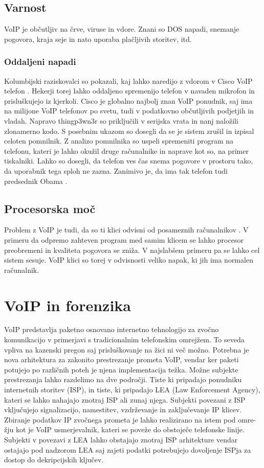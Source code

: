 \documentclass{acm_proc_article-sp}
\begin{document}
\subsection{Varnost}
VoIP je občutljiv na črve, viruse in vdore. Znani so DOS napadi, snemanje pogovora, kraja seje in nato uporaba plačljivih storitev, itd.

\subsubsection{Oddaljeni napadi}
Kolumbijski raziskovalci so pokazali, kaj lahko naredijo z vdorom v Cisco VoIP telefon \cite{CISCO}. Hekerji torej lahko oddaljeno spremenijo telefon v navaden mikrofon in prisluškujejo iz kjerkoli. Cisco je globalno najbolj znan VoIP ponudnik, saj ima na milijone VoIP telefonov po svetu, tudi v podatkovno občutljivih podjetjih in vladah. Napravo thingp3wn3r so priključili v serijska vrata in nanj naložili zlonamerno kodo. S posebnim ukazom so dosegli da se je sistem zrušil in izpisal celoten pomnilnik. Z analizo pomnilnika so uspeli spremeniti program na telefonu, kateri je lahko okužil druge računalnike in naprave kot so, na primer tiskalniki. Lahko so dosegli, da telefon ves čas snema pogovore v prostoru tako, da uporabnik tega sploh ne zazna. Zanimivo je, da ima tak telefon tudi predsednik Obama \cite{OBAMA}.


\subsection{Procesorska moč}
Problem z VoIP je tudi, da so ti klici odvisni od posameznih računalnikov \cite{PROBLEMS}. V primeru da odpremo zahteven program med samim klicem se lahko procesor preobremeni in kvaliteta pogovora se zniža. V najslabšem primeru pa se lahko cel sistem sesuje. VoIP klici so torej v odvisnosti veliko napak, ki jih ima normalen računalnik.


\section{VoIP in forenzika}
VoIP predstavlja paketno osnovano internetno tehnologijo za zvočno komunikacijo v primerjavi s tradicionalnim telefonskim omrejžem. To seveda vpliva na kazenski pregon saj prisluškovanje na žici ni več možno. Potrebna je nova arhitektura za zakonito prestrezanje prometa VoIP, vendar ker paketi potujejo po različnih poteh je njena implementacija težka. Možne subjekte prestrezanja lahko razdelimo na dve področji. Tiste ki pripadajo ponudniku internetnih storitev (ISP), in tiste, ki pripadajo LEA (Law Enforcement Agency), kateri se lahko nahajajo znotraj ISP ali zunaj njega. Subjekti povezani z ISP vključujejo signalizacijo, namestitev, vzdrževanje in zaključevanje IP klicev. Zbiranje podatkov IP zvočnega prometa je lahko realizirano na istem pod omre-žju kot je VoIP usmerjevalnik, kateri se poveže do obstoječe telefonske linije. Subjekti v povezavi z LEA lahko obstajajo znotraj ISP arhitekture vendar ostajajo pod nadzorom LEA saj zajeti podatki potrebujejo dovoljenje ISPja za dostop do dekripcijskih ključev.
\end{document}
